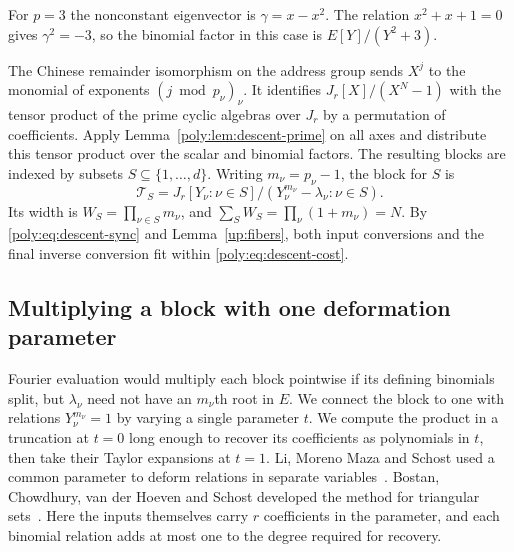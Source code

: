 For $p=3$ the nonconstant eigenvector is $\gamma=x-x^2$. The relation
$x^2+x+1=0$ gives $\gamma^2=-3$, so the binomial factor in this case
is $E[Y]/(Y^2+3)$.

The Chinese remainder isomorphism on the address group sends $X^j$
to the monomial of exponents $(j\bmod p_\nu)_\nu$. It identifies
$J_r[X]/(X^N-1)$ with the tensor product of the prime cyclic algebras
over $J_r$ by a permutation of coefficients. Apply
Lemma~\ref{poly:lem:descent-prime} on all axes and distribute this tensor
product over the scalar and binomial factors. The resulting blocks
are indexed by subsets $S\subseteq\{1,\ldots,d\}$. Writing
$m_\nu=p_\nu-1$, the block for $S$ is
\[
 \mathcal T_S=J_r[Y_\nu:\nu\in S]/
             (Y_\nu^{m_\nu}-\lambda_\nu:\nu\in S).
\]
Its width is $W_S=\prod_{\nu\in S}m_\nu$, and
$\sum_S W_S=\prod_\nu(1+m_\nu)=N$. By
\eqref{poly:eq:descent-sync} and Lemma~\ref{up:fibers}, both input conversions and the final inverse
conversion fit within \eqref{poly:eq:descent-cost}.

\subsection{Multiplying a block with one deformation parameter}
Fourier evaluation would multiply each block pointwise if its defining
binomials split, but $\lambda_\nu$ need not have an $m_\nu$th root in $E$.
We connect the block to one with relations $Y_\nu^{m_\nu}=1$ by varying a
single parameter $t$. We compute the product in a truncation at $t=0$
long enough to recover its coefficients as polynomials in $t$, then take
their Taylor expansions at $t=1$. Li, Moreno Maza and Schost used a common parameter
to deform relations in separate variables~\cite[Section~2.2, proof of Theorem~2]{triangularLMS}.
Bostan, Chowdhury, van der Hoeven and Schost developed the method for
triangular sets~\cite[Section~4.2, Proposition~7]{homotopyBCHS}.
Here the inputs themselves carry $r$ coefficients in the parameter,
and each binomial relation adds at most one to the degree required
for recovery.

